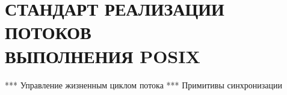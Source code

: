\section[Стандарт реализации потоков выполнения POSIX]{%
  СТАНДАРТ РЕАЛИЗАЦИИ ПОТОКОВ \\
  ВЫПОЛНЕНИЯ POSIX}

*** Управление жизненным циклом потока
*** Примитивы синхронизации